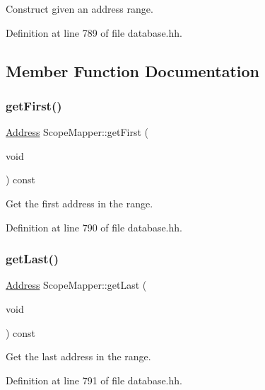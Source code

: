 Construct given an address range. 



Definition at line 789 of file database.\+hh.



\subsection{Member Function Documentation}
\mbox{\label{class_scope_mapper_adf6664a17aad19c26b5d32509273a477}} 
\subsubsection{\texorpdfstring{getFirst()}{getFirst()}}
{\footnotesize\ttfamily \mbox{\hyperlink{class_address}{Address}} Scope\+Mapper\+::get\+First (\begin{DoxyParamCaption}\item[{void}]{ }\end{DoxyParamCaption}) const\hspace{0.3cm}{\ttfamily [inline]}}



Get the first address in the range. 



Definition at line 790 of file database.\+hh.

\mbox{\label{class_scope_mapper_a7b10c3bbd5e521f353276d11f17a8eba}} 
\subsubsection{\texorpdfstring{getLast()}{getLast()}}
{\footnotesize\ttfamily \mbox{\hyperlink{class_address}{Address}} Scope\+Mapper\+::get\+Last (\begin{DoxyParamCaption}\item[{void}]{ }\end{DoxyParamCaption}) const\hspace{0.3cm}{\ttfamily [inline]}}



Get the last address in the range. 



Definition at line 791 of file database.\+hh.

